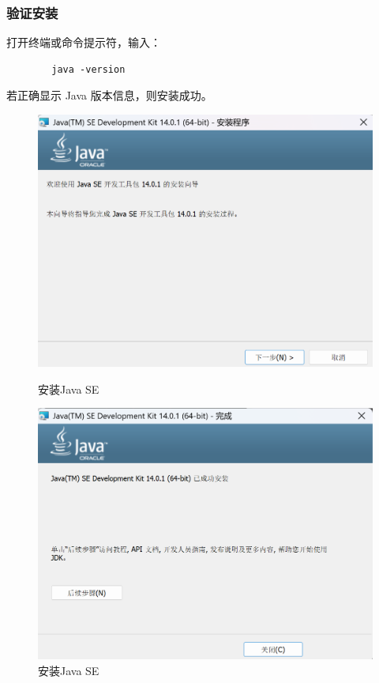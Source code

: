 \documentclass{article}
\begin{document}
	\subsubsection{验证安装}
	打开终端或命令提示符，输入：
	\begin{verbatim}
		java -version
	\end{verbatim}
	若正确显示 Java 版本信息，则安装成功。
	
	\begin{figure}[H]
		\centering
		\begin{minipage}[b]{0.45\textwidth}
			\includegraphics[width=\textwidth]{./images/1.安装Java SE.png}
			\caption{安装Java SE}
		\end{minipage}
		\hfill
		\begin{minipage}[b]{0.45\textwidth}
			\includegraphics[width=\textwidth]{./images/2.安装Java SE.png}
			\caption{安装Java SE}
		\end{minipage}
	\end{figure}
	
\end{document}
